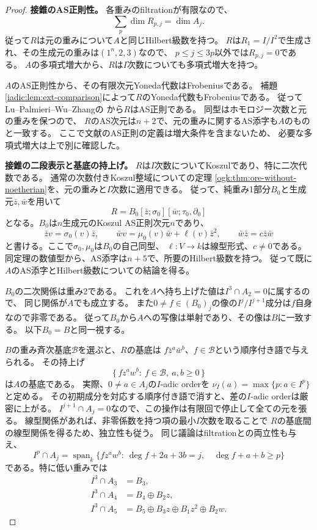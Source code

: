 \documentclass[11pt,a4paper]{ltjsarticle}
\theoremstyle{definition}
\begin{document}
\begin{proof}
\par\smallskip\noindent\textbf{接錐のAS正則性。}\quad
各重みのfiltrationが有限なので、
\[
 \sum_p\dim R_{p,j}=\dim A_j.
\]
従って$R$は元の重みについて$A$と同じHilbert級数を持つ。
$R$は$R_1=I/I^2$で生成され、その生成元の重みは$(1^n,2,3)$なので、
$p\le j\le3p$以外では$R_{p,j}=0$である。
$A$の多項式増大から、$R$は$I$次数についても多項式増大を持つ。

$A$のAS正則性から、その有限次元Yoneda代数はFrobeniusである。
補題\ref{iadic:lem:ext-comparison}によって$R$のYoneda代数もFrobeniusである。
従ってLu--Palmieri--Wu--Zhangの
\cite[Corollary~D, p.~372]{LPWZKoszul}から$R$はAS正則である。
同型はホモロジー次数と元の重みを保つので、
$R$のAS次元は$n+2$で、元の重みに関するAS添字も$A$のものと一致する。
ここで文献のAS正則の定義は増大条件を含まないため、
必要な多項式増大は上で別に確認した。

\par\smallskip\noindent\textbf{接錐の二段表示と基底の持上げ。}\quad
$R$は$I$次数についてKoszulであり、特に二次代数である。
通常の次数付きKoszul整域についての定理
\ref{ogk:thm:ore-without-noetherian}を、元の重みと$I$次数に適用できる。
従って、純重み1部分$B_0$と生成元$\bar z,\bar w$を用いて
\[
 R=B_0[\bar z;\sigma_0][\bar w;\tau_0,\partial_0]
\]
となる。$B_0$は$n$生成元のKoszul AS正則次元$n$であり、
\[
 \bar z v=\sigma_0(v)\bar z,\qquad
 \bar wv=\mu_0(v)\bar w+\ell(v)\bar z^2,
 \qquad \bar w\bar z=c\bar z\bar w
\]
と書ける。ここで$\sigma_0,\mu_0$は$B_0$の自己同型、
$\ell:V\to k$は線型形式、$c\ne0$である。
同定理の数値型から、AS添字は$n+5$で、所要のHilbert級数を持つ。
従って既に$A$のAS添字とHilbert級数についての結論を得る。

$B_0$の二次関係は重み2である。
これを$A$へ持ち上げた値は$I^3\cap A_2=0$に属するので、
同じ関係が$A$でも成立する。
また$0\ne f\in(B_0)_j$の像の$I^j/I^{j+1}$成分は$f$自身なので非零である。
従って$B_0$から$A$への写像は単射であり、その像は$B$に一致する。
以下$B_0=B$と同一視する。

$B$の重み斉次基底$\mathcal B$を選ぶと、$R$の基底は
$f\bar z^a\bar w^b$、$f\in\mathcal B$という順序付き語で与えられる。
その持上げ
\[
 \{\,f z^a w^b:\ f\in\mathcal B,\ a,b\ge0\,\}
\]
は$A$の基底である。
実際、$0\ne a\in A_j$の$I$-adic orderを
$\nu_I(a)=\max\{p:a\in I^p\}$と定める。
その初期成分を対応する順序付き語で消すと、差の$I$-adic orderは厳密に上がる。
$I^{j+1}\cap A_j=0$なので、この操作は有限回で停止して全ての元を張る。
線型関係があれば、非零係数を持つ項の最小$I$次数を取ることで
$R$の基底間の線型関係を得るため、独立性も従う。
同じ議論はfiltrationとの両立性も与え、
\[
 I^p\cap A_j=
 \operatorname{span}_k\{f z^a w^b:\
 \deg f+2a+3b=j,\quad \deg f+a+b\ge p\}
\]
である。特に低い重みでは
\[
 \begin{aligned}
 I^3\cap A_3&=B_3,\\
 I^3\cap A_4&=B_4\oplus B_2z,\\
 I^3\cap A_5&=B_5\oplus B_3z\oplus B_1z^2\oplus B_2w.
 \end{aligned}
\]


\end{proof}
\end{document}
